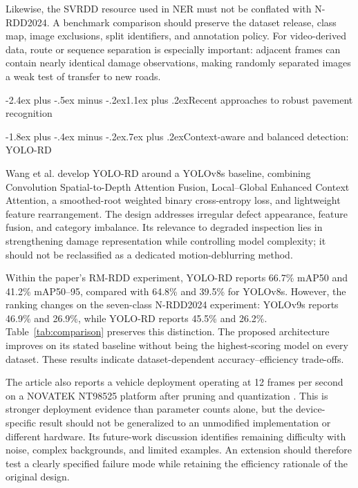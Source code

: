 \documentclass[11pt,a4paper]{article}
\makeatletter
\renewcommand\section{\@startsection{section}{1}{\z@}%
  {-2.4ex plus -.5ex minus -.2ex}{1.1ex plus .2ex}{\normalfont\large\bfseries}}
\renewcommand\subsection{\@startsection{subsection}{2}{\z@}%
  {-1.8ex plus -.4ex minus -.2ex}{.7ex plus .2ex}{\normalfont\normalsize\bfseries}}
\makeatother
\begin{document}
Likewise, the SVRDD resource used in NER \cite{r6} must not be conflated with N-RDD2024. A benchmark comparison should preserve the dataset release, class map, image exclusions, split identifiers, and annotation policy. For video-derived data, route or sequence separation is especially important: adjacent frames can contain nearly identical damage observations, making randomly separated images a weak test of transfer to new roads.

\section{Recent approaches to robust pavement recognition}

\subsection{Context-aware and balanced detection: YOLO-RD}

Wang et al. \cite{r3} develop YOLO-RD around a YOLOv8s baseline, combining Convolution Spatial-to-Depth Attention Fusion, Local--Global Enhanced Context Attention, a smoothed-root weighted binary cross-entropy loss, and lightweight feature rearrangement. The design addresses irregular defect appearance, feature fusion, and category imbalance. Its relevance to degraded inspection lies in strengthening damage representation while controlling model complexity; it should not be reclassified as a dedicated motion-deblurring method.

Within the paper's RM-RDD experiment, YOLO-RD reports 66.7\% mAP50 and 41.2\% mAP50--95, compared with 64.8\% and 39.5\% for YOLOv8s. However, the ranking changes on the seven-class N-RDD2024 experiment: YOLOv9s reports 46.9\% and 26.9\%, while YOLO-RD reports 45.5\% and 26.2\%. Table~\ref{tab:comparison} preserves this distinction. The proposed architecture improves on its stated baseline without being the highest-scoring model on every dataset. These results indicate dataset-dependent accuracy--efficiency trade-offs.

The article also reports a vehicle deployment operating at 12 frames per second on a NOVATEK NT98525 platform after pruning and quantization \cite{r3}. This is stronger deployment evidence than parameter counts alone, but the device-specific result should not be generalized to an unmodified implementation or different hardware. Its future-work discussion identifies remaining difficulty with noise, complex backgrounds, and limited examples. An extension should therefore test a clearly specified failure mode while retaining the efficiency rationale of the original design.
\end{document}
